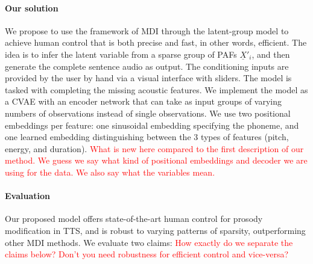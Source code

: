 \documentclass[a4paper,12pt,twoside,openright]{report}
\newcommand{\crit}[1]{\textcolor{red}{#1}}
\begin{document}
\paragraph{Our solution} We propose to use the framework of MDI through the latent-group model to achieve human control that is both precise and fast, in other words, efficient. The idea is to infer the latent variable from a sparse group of PAFs $\underline{X}'_i$, and then generate the complete sentence audio as output. The conditioning inputs are provided by the user by hand via a visual interface with sliders. The model is tasked with completing the missing acoustic features. We implement the model as a CVAE with an encoder network that can take as input groups of varying numbers of observations instead of single observations. We use two positional embeddings per feature: one sinusoidal embedding specifying the phoneme, and one learned embedding distinguishing between the 3 types of features (pitch, energy, and duration). \crit{What is new here compared to the first description of our method. We guess we say what kind of positional embeddings and decoder we are using for the data. We also say what the variables mean.}

\paragraph{Evaluation} Our proposed model offers state-of-the-art human control for prosody modification in TTS, and is robust to varying patterns of sparsity, outperforming other MDI methods. We evaluate two claims: \crit{How exactly do we separate the claims below? Don't you need robustness for efficient control and vice-versa?}
\end{document}

